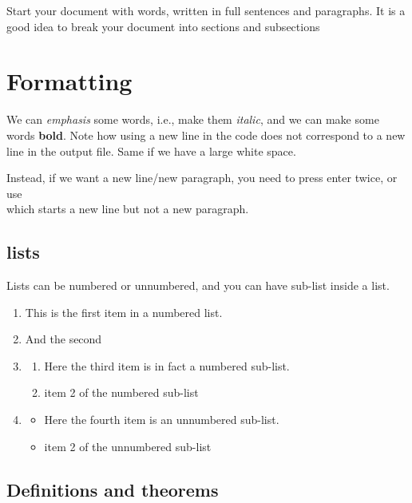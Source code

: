 \documentclass[a4paper,11pt]{article}
\theoremstyle{definition}
\begin{document}
Start your document with words, written in full sentences and paragraphs.
It is a good idea to break your document into sections and subsections

\section{Formatting}

We can \emph{emphasis} some words, i.e., make them \emph{italic}, and we can make some words \textbf{bold}.
Note how using a new line in the code does not correspond to a new line in the output file.
Same if we have        a           large                white                   space.

Instead, if we want a new line/new paragraph, you need to press enter twice, or use \\
which starts a new line but not a new paragraph.

\subsection{lists}

Lists can be numbered or unnumbered, and you can have sub-list inside a list.

\begin{enumerate}
	\item This is the first item in a numbered list.

	\item And the second
	
	\item 
	\begin{enumerate}
		\item Here the third item is in fact a numbered sub-list.
		\item item 2 of the numbered sub-list
	\end{enumerate}

	\item 
	\begin{itemize}
		\item Here the fourth item is an unnumbered sub-list.
		\item item 2 of the unnumbered sub-list
	\end{itemize}
\end{enumerate}

\subsection{Definitions and theorems}
\end{document}
